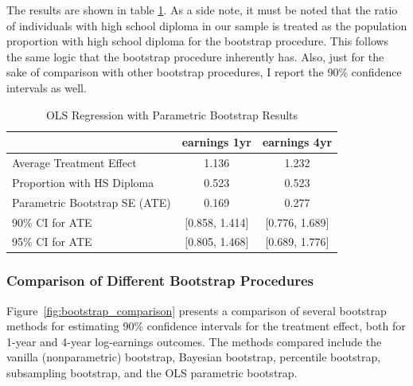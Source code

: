 \documentclass[11pt]{article}
\numberwithin{equation}{section}
\begin{document}
The results are shown in table \ref{tab:ols_regression_results}.
As a side note, it must be noted that the ratio of individuals with high school diploma in our sample 
is treated as the population proportion with high school diploma for the bootstrap procedure. This follows the same logic that the bootstrap procedure inherently has.
Also, just for the sake of comparison with other bootstrap procedures, I report the 90\% confidence intervals as well.

\begin{table}[h]
    \centering
    \begin{tabular}{lcc}
        \hline
         & earnings 1yr & earnings 4yr \\
        \hline
        Average Treatment Effect & 1.136 & 1.232 \\
        Proportion with HS Diploma & 0.523 & 0.523 \\
        Parametric Bootstrap SE (ATE) & 0.169 & 0.277 \\
        90\% CI for ATE & [0.858, 1.414] & [0.776, 1.689] \\
        95\% CI for ATE & [0.805, 1.468] & [0.689, 1.776] \\
        \hline
    \end{tabular}
    \caption{\label{tab:ols_regression_results}OLS Regression with Parametric Bootstrap Results}
\end{table}


\subsubsection{Comparison of Different Bootstrap Procedures}


Figure~\ref{fig:bootstrap_comparison} presents a comparison of several bootstrap methods for estimating 90\% confidence intervals for the treatment effect, both for 1-year and 4-year log-earnings outcomes. The methods compared include the vanilla (nonparametric) bootstrap, Bayesian bootstrap, percentile bootstrap, subsampling bootstrap, and the OLS parametric bootstrap.
\end{document}
